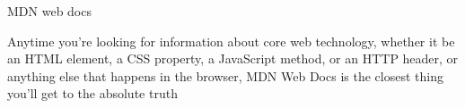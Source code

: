 MDN web docs 

Anytime you're looking for information about core web technology, whether it be an HTML element, a CSS property, a JavaScript method, or an HTTP header, or anything else that happens in the browser, MDN Web Docs is the closest thing you'll get to the absolute truth 